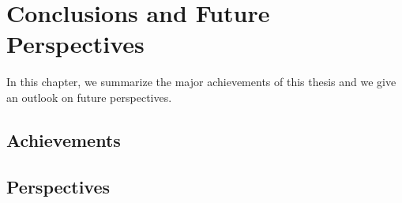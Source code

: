 \chapter{Conclusions and Future Perspectives}  \label{ch:conclusion}

In this chapter, we summarize the major achievements of this thesis and we give an outlook on future perspectives.

\section{Achievements}

\section{Perspectives}
